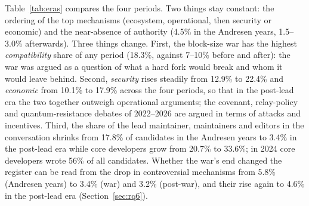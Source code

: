 Table~\ref{tab:eras} compares the four periods. Two things stay constant: the ordering of the top mechanisms (ecosystem, operational, then security or economic) and the near-absence of authority (4.5\% in the Andresen years, 1.5--3.0\% afterwards). Three things change. First, the block-size war has the highest \emph{compatibility} share of any period (18.3\%, against 7--10\% before and after): the war was argued as a question of what a hard fork would break and whom it would leave behind. Second, \emph{security} rises steadily from 12.9\% to 22.4\% and \emph{economic} from 10.1\% to 17.9\% across the four periods, so that in the post-lead era the two together outweigh operational arguments; the covenant, relay-policy and quantum-resistance debates of 2022--2026 are argued in terms of attacks and incentives. Third, the share of the lead maintainer, maintainers and editors in the conversation shrinks from 17.8\% of candidates in the Andresen years to 3.4\% in the post-lead era while core developers grow from 20.7\% to 33.6\%; in 2024 core developers wrote 56\% of all candidates. Whether the war's end changed the register can be read from the drop in controversial mechanisms from 5.8\% (Andresen years) to 3.4\% (war) and 3.2\% (post-war), and their rise again to 4.6\% in the post-lead era (Section~\ref{sec:rq6}).

